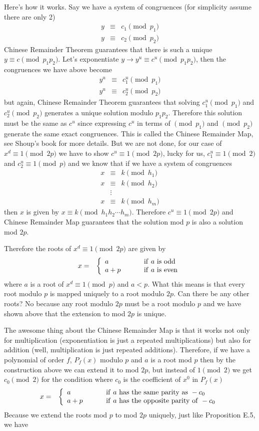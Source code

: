 \documentclass[aps,preprint,preprintnumbers,nofootinbib,showpacs,prd]{revtex4-1}
\newcommand{\nbea}{\begin{eqnarray*}}
\newcommand{\neea}{\end{eqnarray*}}
\begin{document}
Here's how it works. Say we have a system of congruences (for simplicity assume there are only 2)
%
\nbea
y & \equiv & c_1 \pmod{p_1} \\
y & \equiv & c_2 \pmod{p_2}
\neea
%
Chinese Remainder Theorem guarantees that there is such a unique $y \equiv c \pmod{p_1p_2}$. Let's exponentiate $y \to y^u \equiv c^u \pmod{p_1p_2}$, then the congruences we have above become
%
\nbea
y^u & \equiv & c_1^u \pmod{p_1} \\
y^u & \equiv & c^u_2 \pmod{p_2}
\neea
%
but again, Chinese Remainder Theorem guarantees that solving $c_1^u \pmod{p_1}$ and $c^u_2 \pmod{p_2}$ generates a unique solution modulo $p_1p_2$. Therefore this solution must be the same as $c^u$ since expressing $c^u$ in terms of $\pmod{p_1}$ and $\pmod{p_2}$ generate the same exact congruences. This is called the Chinese Remainder Map, see Shoup's book for more details. But we are not done, for our case of $x^d \equiv 1 \pmod{2p}$ we have to show $c^u \equiv 1 \pmod{2p}$, lucky for us, $c_1^u \equiv 1 \pmod{2}$ and $c_2^u \equiv 1 \pmod{p}$ and we know that if we have a system of congruences
%
\nbea
x & \equiv & k \pmod{h_1} \\
x & \equiv & k \pmod{h_2} \\
& \vdots & \\
x & \equiv & k \pmod{h_m}
\neea
%
then $x$ is given by $x \equiv k \pmod{h_1h_2\cdots h_m}$. Therefore $c^u \equiv 1 \pmod{2p}$ and Chinese Remainder Map guarantees that the solution mod $p$ is also a solution mod $2p$.

Therefore the roots of $x^d \equiv 1 \pmod{2p}$ are given by
%
\nbea
x & = & \left \{
\begin{array}{l l}
a & ~~~~~~~ {\rm if~} a ~{\rm is~ odd} \\
a + p & ~~~~~~~ {\rm if~} a~ {\rm is~ even}
\end{array}
\right.
\neea
%
where $a$ is a root of $x^d \equiv 1 \pmod{p}$ and $a < p$. What this means is that every root modulo $p$ is mapped uniquely to a root modulo $2p$. Can there be any other roots? No because any root modulo $2p$ must be a root modulo $p$ and we have shown above that the extension to mod $2p$ is unique.

The awesome thing about the Chinese Remainder Map is that it works not only for multiplication (exponentiation is just a repeated multiplications) but also for addition (well, multiplication is just repeated additions). Therefore, if we have a polynomial of order $f$, $P_f(x)$ modulo $p$ and $a$ is a root mod $p$ then by the construction above we can extend it to mod $2p$, but instead of $1 \pmod{2}$ we get $c_0 \pmod{2}$ for the condition where $c_0$ is the coefficient of $x^0$ in $P_f(x)$
%
\nbea
x & = & \left \{
\begin{array}{l l}
a & ~~~~~~~ {\rm if~} a ~{\rm has~ the~same~parity~as~} -c_0 \\
a + p & ~~~~~~~ {\rm if~} a~ {\rm has~the~opposite~parity~of~} -c_0
\end{array}
\right.
\neea
%
Because we extend the roots mod $p$ to mod $2p$ uniquely, just like Proposition E.5, we have
\end{document}
